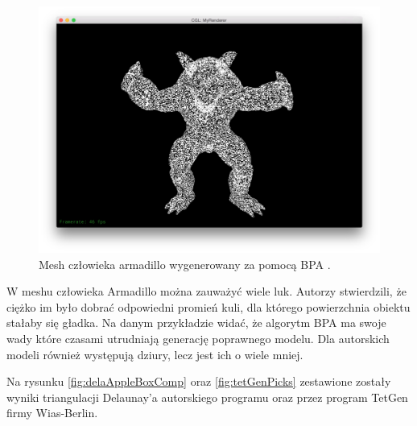 \begin{figure}[H]
  \centering
  \includegraphics[scale=0.2]{armadilloBpa.png}
  \caption{Mesh człowieka armadillo wygenerowany za pomocą BPA \cite{bpaGit}.}   
  \label{fig:armadillo}
\end{figure}
W meshu człowieka Armadillo można zauważyć wiele luk. Autorzy stwierdzili, że ciężko im było dobrać odpowiedni promień kuli, dla którego powierzchnia obiektu stałaby się gładka. Na danym przykładzie widać, że algorytm BPA ma swoje wady które czasami utrudniają generację poprawnego modelu. Dla autorskich modeli również występują dziury, lecz jest ich o wiele mniej.

Na rysunku \ref{fig:delaAppleBoxComp} oraz \ref{fig:tetGenPicks} zestawione zostały wyniki triangulacji Delaunay'a autorskiego programu oraz przez program TetGen firmy Wias-Berlin.

